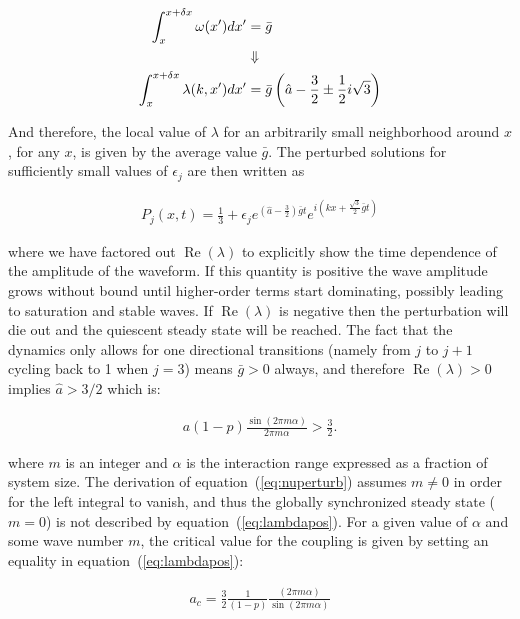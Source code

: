 \begin{align}
  \int_x^{x+\delta x} \omega(x')dx' &= \bar{g} \notag\\
  & \Downarrow \notag\\
  \int_x^{x+\delta x} \lambda(k,x')dx' &= \bar{g} \left( \hat{a} - \frac{3}{2} \pm \frac{1}{2}i\sqrt{3} \right)
\end{align}

And therefore, the local value of $\lambda$ for an arbitrarily small neighborhood around $x$, for any $x$, is given by the average
value $\bar{g}$. The perturbed solutions for sufficiently small values of $\epsilon_j$ are then written as

\begin{align}
  P_j(x,t) = \frac{1}{3} + \epsilon_j e^{\left( \hat{a} - \frac{3}{2} \right)\bar{g}t} e^{i\left(kx + \frac{\sqrt{3}}{2}\bar{g}t\right)}
\end{align}

\noindent where we have factored out $\operatorname{Re}(\lambda)$ to explicitly show the time dependence of the amplitude of the
waveform. If this quantity is positive the wave amplitude grows without bound until higher-order terms start dominating, possibly
leading to saturation and stable waves. If $\operatorname{Re}(\lambda)$ is negative then the perturbation will die out and the
quiescent steady state will be reached. The fact that the dynamics only allows for one directional transitions (namely from $j$ to
$j+1$ cycling back to 1 when $j=3$) means $\bar{g}>0$ always, and therefore $\operatorname{Re}(\lambda)>0$ implies $\hat{a} > 3/2$
which is:

\begin{align}
  a(1-p)\frac{\sin(2\pi m\alpha)}{2\pi m\alpha} > \frac{3}{2}.
  \label{eq:lambdapos}
\end{align}

\noindent where $m$ is an integer and $\alpha$ is the interaction range expressed as a fraction of system size. The derivation of
equation~(\ref{eq:nuperturb}) assumes $m\neq 0$ in order for the left integral to vanish, and thus the globally synchronized steady
state ($m=0$) is not described by equation~(\ref{eq:lambdapos}). For a given value of $\alpha$ and some wave number $m$, the critical
value for the coupling is given by setting an equality in equation~(\ref{eq:lambdapos}):

\begin{align}
  a_c = \frac{3}{2}\frac{1}{(1-p)}\frac{(2\pi m\alpha)}{\sin(2\pi m\alpha)}
	\label{eq:ac}
\end{align}

